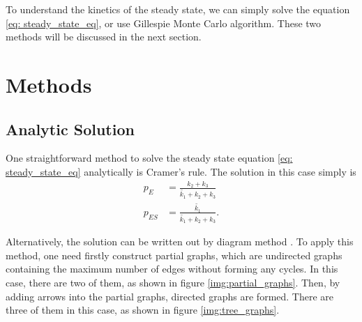 	To understand the kinetics of the steady state, we can simply solve the equation \eqref{eq: steady_state_eq}, or use Gillespie Monte Carlo algorithm. These two methods will be discussed in the next section.

\section{Methods}
	\subsection{Analytic Solution}
		One straightforward method to solve the steady state equation \eqref{eq: steady_state_eq} analytically is Cramer's rule. The solution in this case simply is 
		\begin{equation}
			\begin{aligned}
				p_E &= \frac{k_2+k_3}{\widetilde{k_1}+k_2+k_3}\\
				p_{ES} &= \frac{\widetilde{k_1}}{\widetilde{k_1}+k_2+k_3}.
			\end{aligned}
			\label{eq:state_prob}
		\end{equation}

		Alternatively, the solution can be written out by diagram method \cite{hill2004}. To apply this method, one need firstly construct partial graphs, which are undirected graphs containing the maximum number of edges without forming any cycles. In this case, there are two of them, as shown in figure \ref{img:partial_graphs}. Then, by adding arrows into the partial graphs, directed graphs are formed. There are three of them in this case, as shown in figure \ref{img:tree_graphs}.

